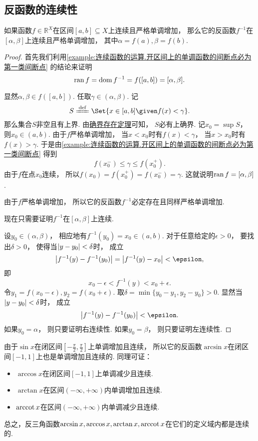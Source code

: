 \subsection{反函数的连续性}
\begin{theorem}\label{theorem:极限.连续函数的极限2}
如果函数\(f\in\mathbb{R}^X\)在区间\([a,b]\subseteq X\)上连续且严格单调增加，
那么它的反函数\(f^{-1}\)在\([\alpha,\beta]\)上连续且严格单调增加，
其中\(\alpha=f(a),\beta=f(b)\).
\begin{proof}
首先我们利用\cref{example:连续函数的运算.开区间上的单调函数的间断点必为第一类间断点} 的结论来证明\[
	\operatorname{ran} f
	= \operatorname{dom} f^{-1}
	= f([a,b])
	= [\alpha,\beta].
\]

显然\(\alpha,\beta \in f([a,b])\).
任取\(\gamma\in(\alpha,\beta)\).
记\[
	S \defeq \Set{ x\in[a,b] \given f(x)<\gamma }.
\]
那么集合\(S\)非空且有上界.
由\hyperref[theorem:实数.确界原理]{确界存在定理}可知，
\(S\)必有上确界.
记\(x_0 = \sup S\)，
则\(x_0\in(a,b)\).
由于\(f\)严格单调增加，
当\(x<x_0\)时有\(f(x)<\gamma\)，
当\(x>x_0\)时有\(f(x)>\gamma\).
于是由\cref{example:连续函数的运算.开区间上的单调函数的间断点必为第一类间断点} 得到\[
	f(x_0^-) \leq \gamma \leq f(x_0^+).
\]
由于\(f\)在点\(x_0\)连续，
所以\(f(x_0)
= f(x_0^+)
= f(x_0^-)
= \gamma\).
这就说明\(\operatorname{ran} f = [\alpha,\beta]\).

由于\(f\)严格单调增加，
所以它的反函数\(f^{-1}\)必定存在且同样严格单调增加.

现在只需要证明\(f^{-1}\)在\([\alpha,\beta]\)上连续.

设\(y_0\in(\alpha,\beta)\)，
相应地有\(f^{-1}(y_0)=x_0\in(a,b)\).
对于任意给定的\(\epsilon>0\)，
要找出\(\delta>0\)，
使得当\(\abs{y-y_0}<\delta\)时，
成立\[
	\abs{f^{-1}(y) - f^{-1}(y_0)}
	= \abs{f^{-1}(y) - x_0}
	< \epsilon,
\]
即\[
	x_0 - \epsilon < f^{-1}(y) < x_0 + \epsilon.
\]
令\(y_1 = f(x_0 - \epsilon),
y_2 = f(x_0 + \epsilon)\).
取\(\delta = \min\{y_0 - y_1, y_2 - y_0\} > 0\).
显然当\(\abs{y - y_0} < \delta\)时，
成立\[
	\abs{f^{-1}(y) - f^{-1}(y_0)} < \epsilon.
\]
如果\(y_0 = \alpha\)，
则只要证明右连续性.
如果\(y_0 = \beta\)，
则只要证明左连续性.
\end{proof}
\end{theorem}

\begin{example}
由于\(\sin x\)在闭区间\(\left[-\frac{\pi}{2},\frac{\pi}{2}\right]\)上单调增加且连续，
所以它的反函数\(\arcsin x\)在闭区间\([-1,1]\)上也是单调增加且连续的.
同理可证：
\begin{itemize}
	\item \(\arccos x\)在闭区间\([-1,1]\)上单调减少且连续.
	\item \(\arctan x\)在区间\((-\infty,+\infty)\)内单调增加且连续.
	\item \(\arccot x\)在区间\((-\infty,+\infty)\)内单调减少且连续.
\end{itemize}
总之，反三角函数\(\arcsin x,\arccos x,\arctan x,\arccot x\)在它们的定义域内都是连续的.
\end{example}

